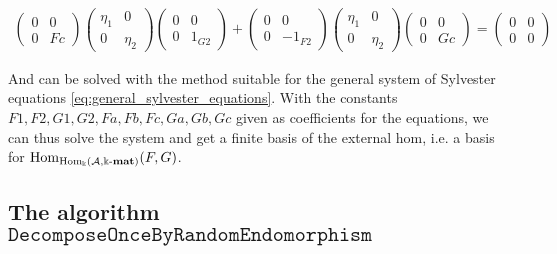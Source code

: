 \begin{example}
\begin{subequations}
\begin{align}
\begin{pmatrix} 0 & 0 \\ 0 & Fc \end{pmatrix} \begin{pmatrix} \eta_{1} & 0 \\ 0 & \eta_{2} \end{pmatrix}
\begin{pmatrix}0 & 0 \\ 0 & 1_{G2} \end{pmatrix}
+ \begin{pmatrix} 0 & 0 \\ 0 & -1_{F2} \end{pmatrix} \begin{pmatrix} \eta_{1} & 0 \\ 0 & \eta_{2} \end{pmatrix}
\begin{pmatrix} 0 & 0 \\ 0 & Gc \end{pmatrix} = \begin{pmatrix} 0 & 0 \\ 0 & 0 \end{pmatrix} 
\end{align}
\end{subequations}

And can be solved with the method suitable for the general system of Sylvester equations \eqref{eq:general_sylvester_equations}.
With the constants $F1, F2, G1, G2, Fa, Fb, Fc, Ga, Gb, Gc$ given as coefficients for the equations, we can thus solve the system and
get a finite basis of the external hom, i.e. a basis for $\mathrm{Hom}_{\mathrm{Hom_{\Bbbk}}(\mathcal{A},\Bbbk\textnormal{-}\mathbf{mat})}(F,G)$.
\end{example}

\subsection{The algorithm $\mathtt{DecomposeOnceByRandomEndomorphism}$}

